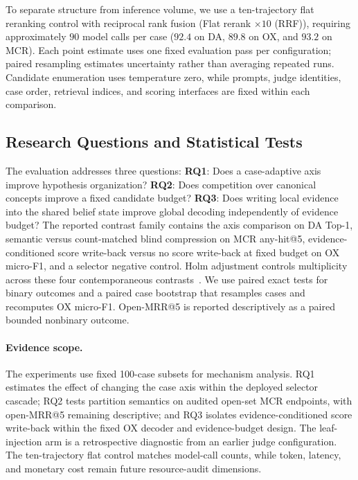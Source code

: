 \documentclass[letterpaper]{article} %
\begin{document}
To separate structure from inference volume, we use a ten-trajectory flat reranking control with reciprocal rank fusion (Flat rerank $\times 10$ (RRF)), requiring approximately $90$ model calls per case ($92.4$ on DA, $89.8$ on OX, and $93.2$ on MCR).
Each point estimate uses one fixed evaluation pass per configuration; paired resampling estimates uncertainty rather than averaging repeated runs.
Candidate enumeration uses temperature zero, while prompts, judge identities, case order, retrieval indices, and scoring interfaces are fixed within each comparison.

\subsection{Research Questions and Statistical Tests}

The evaluation addresses three questions:
\textbf{RQ1}: Does a case-adaptive axis improve hypothesis organization?
\textbf{RQ2}: Does competition over canonical concepts improve a fixed candidate budget?
\textbf{RQ3}: Does writing local evidence into the shared belief state improve global decoding independently of evidence budget?
The reported contrast family contains the axis comparison on DA Top-1, semantic versus count-matched blind compression on MCR any-hit@5, evidence-conditioned score write-back versus no score write-back at fixed budget on OX micro-F1, and a selector negative control.
Holm adjustment controls multiplicity across these four contemporaneous contrasts~\cite{holm1979}.
We use paired exact tests for binary outcomes and a paired case bootstrap that resamples cases and recomputes OX micro-F1.
Open-MRR@5 is reported descriptively as a paired bounded nonbinary outcome.

\paragraph{Evidence scope.}
The experiments use fixed 100-case subsets for mechanism analysis.
RQ1 estimates the effect of changing the case axis within the deployed selector cascade; RQ2 tests partition semantics on audited open-set MCR endpoints, with open-MRR@5 remaining descriptive; and RQ3 isolates evidence-conditioned score write-back within the fixed OX decoder and evidence-budget design.
The leaf-injection arm is a retrospective diagnostic from an earlier judge configuration.
The ten-trajectory flat control matches model-call counts, while token, latency, and monetary cost remain future resource-audit dimensions.
\end{document}
